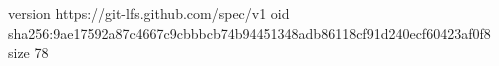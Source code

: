 version https://git-lfs.github.com/spec/v1
oid sha256:9ae17592a87c4667c9cbbbcb74b94451348adb86118cf91d240ecf60423af0f8
size 78

